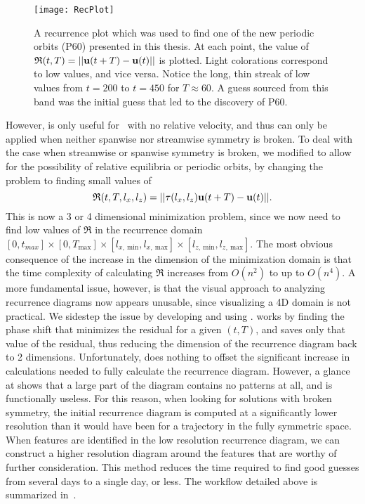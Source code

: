 \begin{figure}[h]
\texttt{[image: RecPlot]}
\caption[A recurrence plot which was used to find one of the new periodic orbits (P60) presented in this thesis.]{A recurrence plot which was used to find one of the new periodic orbits (P60) presented in this thesis. At each point, the value of  $\mathfrak{R}(t,T) = ||\mathbf{u}(t+T) - \mathbf{u}(t)||$ is plotted. Light colorations correspond to low values, and vice versa. Notice the long, thin streak of low values from $t = 200$ to $t = 450$  for $T \approx 60$. A guess sourced from this band was the initial guess that led to the discovery of P60.}\label{fig:recurrenceMinimum}
\end{figure}
 However,  is only useful for \ecs\ with no relative velocity, and thus can only be applied when neither spanwise nor streamwise symmetry is broken. To deal with the case when streamwise or spanwise symmetry is broken, we modified  to allow for the possibility of relative equilibria or periodic orbits, by changing the problem to finding small values of 
 \begin{equation}\label{eq:4DrecurrenceEQ}
 \mathfrak{R}(t,T,l_x,l_z) = ||\tau(l_x,l_z)\mathbf{u}(t+T) - \mathbf{u}(t)||.
  \end{equation}
 This is now a 3 or 4 dimensional minimization problem, since we now need to find low values of $\mathfrak{R}$ in the recurrence domain $[0,t_{max}]\times [0,T_{\textrm{max}}] \times [l_{x,~\textrm{min}},l_{x,~\textrm{max}}] \times [l_{z,~\textrm{min}},l_{z,~\textrm{max}}]$. The most obvious consequence of the increase in the dimension of the minimization domain is that the time complexity of calculating $\mathfrak{R}$ increases from $O(n^2)$ to up to $O(n^4)$. A more fundamental issue, however, is that the visual approach to analyzing recurrence diagrams  now appears unusable, since visualizing a 4D domain is not practical. We sidestep the issue by developing and using .  works by finding the phase shift that minimizes the residual for a given $(t,T)$, and saves only that value of the residual, thus reducing the dimension of the recurrence diagram back to 2 dimensions. Unfortunately,  does nothing to offset the significant increase in calculations needed to fully calculate the recurrence diagram. However, a glance at  shows that a large part of the diagram contains no patterns at all, and is functionally useless. For this reason, when looking for solutions with broken symmetry, the initial recurrence diagram is computed at a significantly lower resolution than it would have been for a trajectory in the fully symmetric space. When features are identified in the low resolution recurrence diagram, we can construct a higher resolution diagram around the features that are worthy of further consideration. This method reduces the time required to find good guesses from several days to a single day, or less. The workflow detailed above is summarized in~. 


